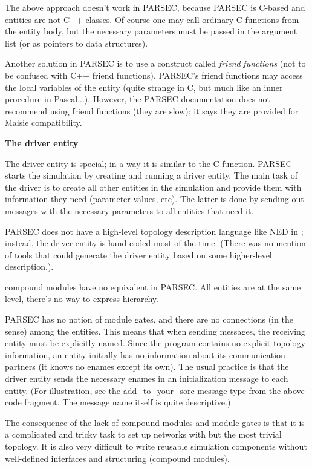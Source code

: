 The above approach doesn't work in PARSEC, because PARSEC is 
C-based and entities are not C++ classes. Of course one may call 
ordinary C functions from the entity body, but the necessary 
parameters must be passed in the argument list (or as pointers 
to data structures).

Another solution in PARSEC is to use a construct called \textit{friend} \textit{functions} 
(not to be confused with C++ friend functions). PARSEC's friend 
functions may access the local variables of the entity (quite 
strange in C, but much like an inner procedure in Pascal...). 
However, the PARSEC documentation does not recommend using friend 
functions (they are slow); it says they are provided for Maisie 
compatibility.


\textbf{The driver entity}


The driver entity is special; in a way it is similar to the C  
function. PARSEC starts the simulation by creating and running 
a driver entity. The main task of the driver is to create all 
other entities in the simulation and provide them with information 
they need (parameter values, etc). The latter is done by sending 
out messages with the necessary parameters to all entities that 
need it.


PARSEC does not have a high-level topology description language 
like NED in {\opp}; instead, the driver entity is hand-coded 
most of the time. (There was no mention of tools that could generate 
the driver entity based on some higher-level description.).


{\opp} compound modules have no equivalent in PARSEC. All entities are
at the same level, there's no way to express hierarchy.


PARSEC has no notion of module gates, and there are no connections 
(in the {\opp} sense) among the entities. This means that when 
sending messages, the receiving entity must be explicitly named. 
Since the program contains no explicit topology information, 
an entity initially has no information about its communication 
partners (it knows no enames except its own). The usual practice 
is that the driver entity sends the necessary enames in an initialization 
message to each entity. (For illustration, see the add\_to\_your\_sorc 
message type from the above code fragment. The message name itself 
is quite descriptive.)

The consequence of the lack of compound modules and module gates is
that it is a complicated and tricky task to set up networks with but
the most trivial topology. It is also very difficult to write reusable
simulation components without well-defined interfaces and structuring
(compound modules).


